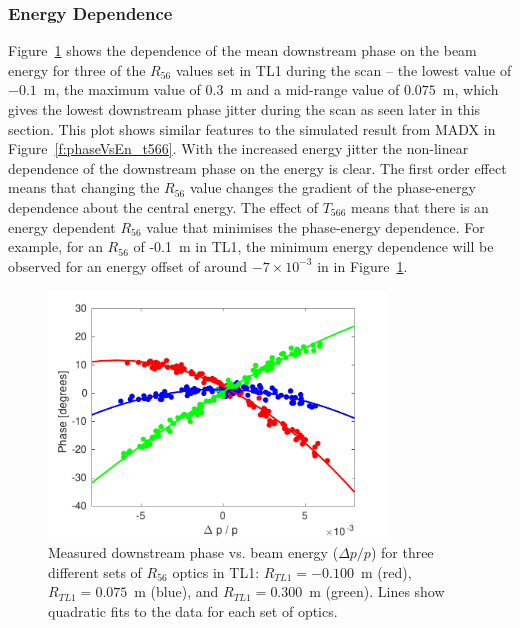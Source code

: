 \subsubsection{Energy Dependence}

Figure~\ref{f:R56ScanGunWiggle_PhaseVsEnergy} shows the dependence of the mean downstream phase on the beam energy for three of the \(R_{56}\) values set in TL1 during the scan -- the lowest value of \(-0.1\)~m, the maximum value of \(0.3\)~m and a mid-range value of \(0.075\)~m, which gives the lowest downstream phase jitter during the scan as seen later in this section. This plot shows similar features to the simulated result from MADX in Figure~\ref{f:phaseVsEn_t566}. With the increased energy jitter the non-linear dependence of the downstream phase on the energy is clear. The first order effect means that changing the \(R_{56}\) value changes the gradient of the phase-energy dependence about the central energy. The effect of \(T_{566}\) means that there is an energy dependent \(R_{56}\) value that minimises the phase-energy dependence. For example, for an \(R_{56}\) of -0.1~m in TL1, the minimum energy dependence will be observed for an energy offset of around \(-7\times10^{-3}\) in in Figure~\ref{f:R56ScanGunWiggle_PhaseVsEnergy}.

\begin{figure}
  \centering
  \includegraphics[width=0.8\textwidth]{Figures/propagation/R56ScanGunWiggle_PhaseVsEnergy}
  \caption{Measured downstream phase vs. beam energy (\(\Delta p/p\)) for three different sets of \(R_{56}\) optics in TL1: \(R_{TL1}=-0.100\)~m (red), \(R_{TL1}=0.075\)~m (blue), and \(R_{TL1}=0.300\)~m (green). Lines show quadratic fits to the data for each set of optics.}
  \label{f:R56ScanGunWiggle_PhaseVsEnergy}
\end{figure}


